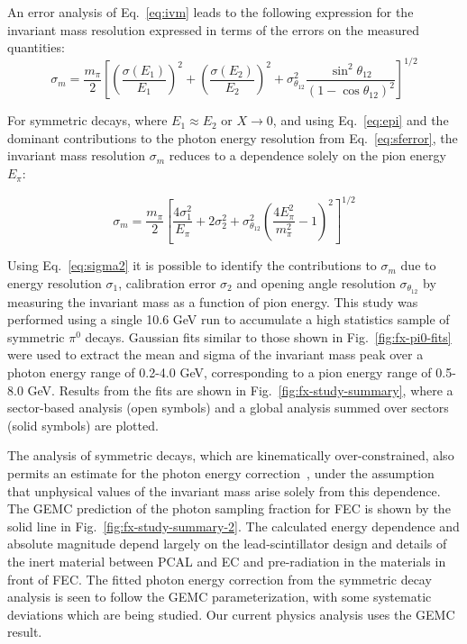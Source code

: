 An error analysis of Eq.~\ref{eq:ivm} leads to the following expression for the invariant mass resolution expressed in terms of the errors on the measured quantities:
\begin{equation}
\sigma_m  = \frac{m_{\pi}}{2}\left[\left(\frac{\sigma(E_1)}{E_1}\right)^2 + \left(\frac{\sigma(E_2)}{E_2}\right)^2 + \sigma^2_{\theta_{12}}\frac{\sin^2 \theta_{12}}{(1-\cos \theta_{12})^2}\right]^{1/2}
\label{eq:sigmam1}
\end{equation}

For symmetric decays, where $E_1 \approx E_2$ or $X \rightarrow 0$, and using Eq.~\ref{eq:epi} and the dominant contributions to the photon energy resolution from Eq.~\ref{eq:sferror}, the invariant mass resolution $\sigma_m$ reduces to a dependence solely on the pion energy $E_{\pi}$:

\begin{equation}
\sigma_m = \frac{m_{\pi}}{2}\left[\frac{4 \sigma^2_1}{E_{\pi}} + 2 \sigma^2_2 + \sigma^2_{\theta_{12}}\left(\frac{4 E^2_{\pi}}{m^2_{\pi}}-1\right)^2\right]^{1/2} 
\label{eq:sigma2}
\end{equation}

Using Eq.~\ref{eq:sigma2} it is possible to identify the contributions to $\sigma_m$ due to energy resolution $\sigma_1$, calibration error $\sigma_2$ and opening angle resolution $\sigma_{\theta_{12}}$ by measuring the invariant mass as a function of pion energy.  This study was performed using a single 10.6 GeV run to accumulate a high statistics sample of symmetric $\pi^{0}$ decays.  Gaussian fits similar to those shown in Fig.~\ref{fig:fx-pi0-fits} were used to extract the mean and sigma of the invariant mass peak over a photon energy range of 0.2-4.0 GeV, corresponding to a pion energy range of 0.5-8.0 GeV.  Results from the fits are shown in Fig.~\ref{fig:fx-study-summary}, where a sector-based analysis (open symbols) and a global analysis summed over sectors (solid symbols) are plotted.  

The analysis of symmetric decays, which are kinematically over-constrained, also permits an estimate for the photon energy correction~\cite{2006015}, under the assumption that unphysical values of the invariant mass arise solely from this dependence.  The GEMC prediction of the photon sampling fraction for FEC is shown by the solid line in Fig.~\ref{fig:fx-study-summary-2}.   The calculated energy dependence and absolute magnitude depend largely on the lead-scintillator design and details of the inert material between PCAL and EC and pre-radiation in the materials in front of FEC.  The fitted photon energy correction from the symmetric decay analysis is seen to follow the GEMC parameterization, with some systematic deviations which are being studied.  Our current physics analysis uses the GEMC result.

